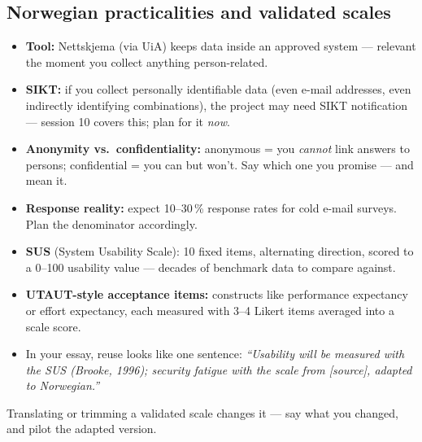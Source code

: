 \documentclass[11pt,a4paper,british,twoside=false,headings=small,chapterprefix=false,numbers=noenddot]{scrbook}
\newenvironment{alertblock}[1]{\begin{tcolorbox}[scriptbox, colframe=uiared, colback=uiamutedred, title={#1}]}{\end{tcolorbox}}
\begin{document}
\subsection{Norwegian practicalities and validated scales}
\begin{center}\small
\begin{itemize}\setlength{\itemsep}{0.5em}
    \item \textbf{Tool:} Nettskjema (via UiA) keeps data inside an
          approved system --- relevant the moment you collect anything
          person-related.
    \item \textbf{SIKT:} if you collect personally identifiable data (even
          e-mail addresses, even indirectly identifying combinations), the
          project may need SIKT notification --- session 10 covers this; plan
          for it \emph{now}.
    \item \textbf{Anonymity vs.\ confidentiality:} anonymous = you
          \emph{cannot} link answers to persons; confidential = you can but
          won't. Say which one you promise --- and mean it.
    \item \textbf{Response reality:} expect 10--30\,\% response rates for
          cold e-mail surveys. Plan the denominator accordingly.
  \end{itemize}
\end{center}

\begin{center}\small
\begin{itemize}\setlength{\itemsep}{0.45em}
    \item \textbf{SUS} (System Usability Scale): 10 fixed items, alternating
          direction, scored to a 0--100 usability value --- decades of
          benchmark data to compare against.
    \item \textbf{UTAUT-style acceptance items:} constructs like performance
          expectancy or effort expectancy, each measured with 3--4 Likert
          items averaged into a scale score.
    \item In your essay, reuse looks like one sentence: \emph{``Usability
          will be measured with the SUS (Brooke, 1996); security fatigue with
          the scale from [source], adapted to Norwegian.''}
  \end{itemize}
  
  \begin{alertblock}{Adaptation warning}
    Translating or trimming a validated scale changes it --- say what you
    changed, and pilot the adapted version.
  \end{alertblock}
\end{center}
\end{document}
